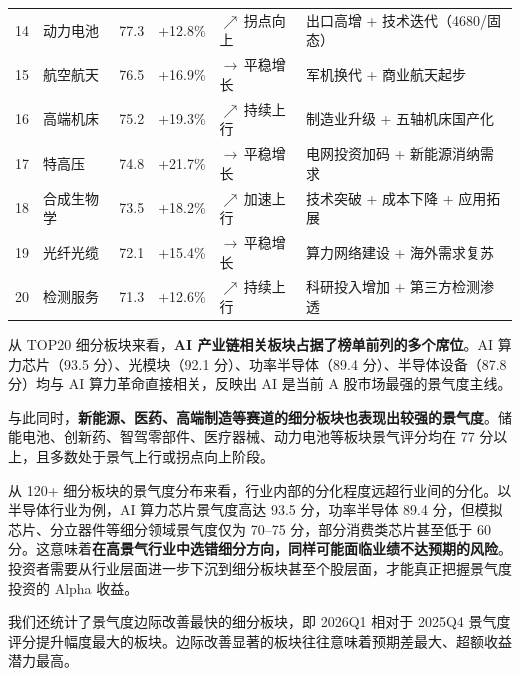 \begin{exhibitbox}
\begin{tabularx}{\textwidth}{@{}c l r r m{2.2cm} X@{}}
14 & 动力电池 & 77.3 & +12.8\% & $\nearrow\,$拐点向上 & 出口高增 + 技术迭代（4680/固态） \\
15 & 航空航天 & 76.5 & +16.9\% & $\rightarrow\,$平稳增长 & 军机换代 + 商业航天起步 \\
16 & 高端机床 & 75.2 & +19.3\% & $\nearrow\,$持续上行 & 制造业升级 + 五轴机床国产化 \\
17 & 特高压 & 74.8 & +21.7\% & $\rightarrow\,$平稳增长 & 电网投资加码 + 新能源消纳需求 \\
18 & 合成生物学 & 73.5 & +18.2\% & $\nearrow\,$加速上行 & 技术突破 + 成本下降 + 应用拓展 \\
19 & 光纤光缆 & 72.1 & +15.4\% & $\rightarrow\,$平稳增长 & 算力网络建设 + 海外需求复苏 \\
20 & 检测服务 & 71.3 & +12.6\% & $\nearrow\,$持续上行 & 科研投入增加 + 第三方检测渗透 \\
\bottomrule
\end{tabularx}
\vspace{0.2cm}
\end{exhibitbox}

从 TOP20 细分板块来看，\textbf{AI 产业链相关板块占据了榜单前列的多个席位}。AI 算力芯片（93.5 分）、光模块（92.1 分）、功率半导体（89.4 分）、半导体设备（87.8 分）均与 AI 算力革命直接相关，反映出 AI 是当前 A 股市场最强的景气度主线。

\smallskip

与此同时，\textbf{新能源、医药、高端制造等赛道的细分板块也表现出较强的景气度}。储能电池、创新药、智驾零部件、医疗器械、动力电池等板块景气评分均在 77 分以上，且多数处于景气上行或拐点向上阶段。

\begin{keyinsight}[细分层面的景气度差异远大于行业层面]
从 120+ 细分板块的景气度分布来看，行业内部的分化程度远超行业间的分化。以半导体行业为例，AI 算力芯片景气度高达 93.5 分，功率半导体 89.4 分，但模拟芯片、分立器件等细分领域景气度仅为 70--75 分，部分消费类芯片甚至低于 60 分。这意味着\textbf{在高景气行业中选错细分方向，同样可能面临业绩不达预期的风险}。投资者需要从行业层面进一步下沉到细分板块甚至个股层面，才能真正把握景气度投资的 Alpha 收益。
\end{keyinsight}

我们还统计了景气度边际改善最快的细分板块，即 2026Q1 相对于 2025Q4 景气度评分提升幅度最大的板块。边际改善显著的板块往往意味着预期差最大、超额收益潜力最高。

